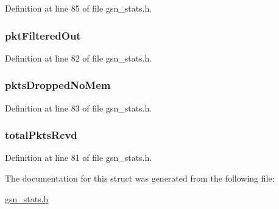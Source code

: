 Definition at line 85 of file gsn\_\-stats.h.

\hypertarget{a00176_a749aa965c1b0568a2852a53557e019cc}{
\subsubsection[{pktFilteredOut}]{ {\bf pktFilteredOut}}}
\label{a00176_a749aa965c1b0568a2852a53557e019cc}


Definition at line 82 of file gsn\_\-stats.h.

\hypertarget{a00176_ad206d718956ea79ad16f513d70d7f20f}{
\subsubsection[{pktsDroppedNoMem}]{ {\bf pktsDroppedNoMem}}}
\label{a00176_ad206d718956ea79ad16f513d70d7f20f}


Definition at line 83 of file gsn\_\-stats.h.

\hypertarget{a00176_a05ef4606fe87c63ea580827f8de8154a}{
\subsubsection[{totalPktsRcvd}]{ {\bf totalPktsRcvd}}}
\label{a00176_a05ef4606fe87c63ea580827f8de8154a}


Definition at line 81 of file gsn\_\-stats.h.



The documentation for this struct was generated from the following file:\begin{DoxyCompactItemize}
\item 
\hyperlink{a00591}{gsn\_\-stats.h}\end{DoxyCompactItemize}

